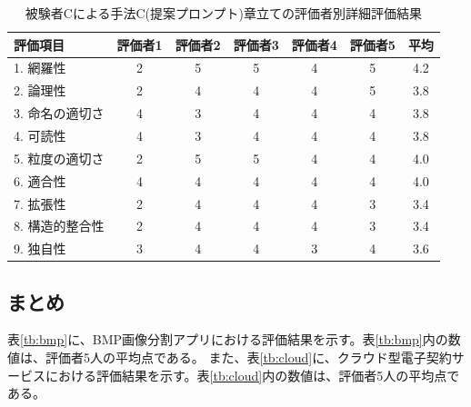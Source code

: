\begin{table}[tp]
  \caption{被験者Cによる手法C(提案プロンプト)章立ての評価者別詳細評価結果}
  \label{tb:cloud_detailed_evaluation_results_C2}
  \centering
  \begin{tabular}{|l|c|c|c|c|c|c|}
    \hline
    \textbf{評価項目} & \textbf{評価者1} & \textbf{評価者2} & \textbf{評価者3} & \textbf{評価者4} & \textbf{評価者5} & \textbf{平均} \\
    \hline\hline
    1. 網羅性 & 2 & 5 & 5 & 4 & 5 & 4.2 \\
    \hline
    2. 論理性 & 2 & 4 & 4 & 4 & 5 & 3.8 \\
    \hline
    3. 命名の適切さ & 4 & 3 & 4 & 4 & 4 & 3.8 \\
    \hline
    4. 可読性 & 4 & 3 & 4 & 4 & 4 & 3.8 \\
    \hline
    5. 粒度の適切さ & 2 & 5 & 5 & 4 & 4 & 4.0 \\
    \hline
    6. 適合性 & 4 & 4 & 4 & 4 & 4 & 4.0 \\
    \hline
    7. 拡張性 & 2 & 4 & 4 & 4 & 3 & 3.4 \\
    \hline
    8. 構造的整合性 & 2 & 4 & 4 & 4 & 3 & 3.4 \\
    \hline
    9. 独自性 & 3 & 4 & 4 & 3 & 4 & 3.6 \\
    \hline
  \end{tabular}
\end{table}


\subsection{まとめ}


表\ref{tb:bmp}に、BMP画像分割アプリにおける評価結果を示す。表\ref{tb:bmp}内の数値は、評価者5人の平均点である。
また、表\ref{tb:cloud}に、クラウド型電子契約サービスにおける評価結果を示す。表\ref{tb:cloud}内の数値は、評価者5人の平均点である。


